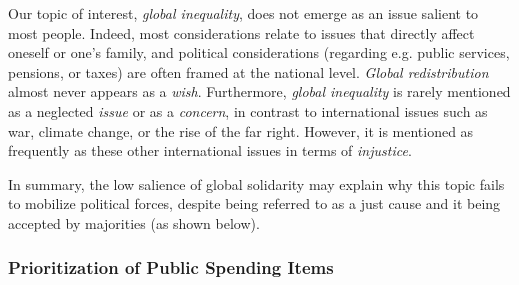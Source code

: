 \documentclass[12pt,english]{article}
\begin{document}
\begin{bibunit}
Our topic of interest, \textit{global inequality}, does not emerge as an issue salient to most people. Indeed, most considerations relate to issues that directly affect oneself or one's family, and political considerations (regarding e.g. public services, pensions, or taxes) are often framed at the national level. \textit{Global redistribution} almost never appears as a \textit{wish}. Furthermore, \textit{global inequality} is rarely mentioned as a neglected \textit{issue} or as a \textit{concern}, in contrast to international issues such as war, climate change, or the rise of the far right. However, it is mentioned as frequently as these other international issues in terms of \textit{injustice}. 

In summary, the low salience of global solidarity may explain why this topic fails to mobilize political forces, despite being referred to as a just cause and it being accepted by majorities (as shown below). 

\subsubsection{Prioritization of Public Spending Items}\label{subsec:revenue_split}


\end{bibunit}
\end{document}
